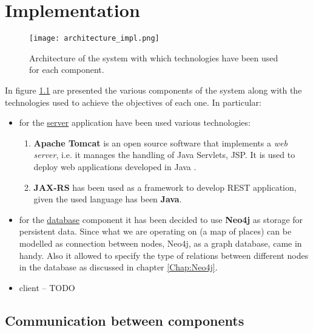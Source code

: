 \chapter{Implementation}\label{Chap:Impl}
\begin{figure}[!htb]
   \centering
   \texttt{[image: architecture\_impl.png]}
   \caption{Architecture of the system with which technologies have been used for each component.}\label{Fig:ArchImpl}
\end{figure}
In figure \ref{Fig:ArchImpl} are presented the various components of the system along with the technologies used to achieve the objectives of each one. In particular:
\begin{itemize}
  \item for the \underline{server} application have been used various technologies:
    \begin{enumerate}
      \item \textbf{Apache Tomcat} is an open source software that implements a \textit{web server}, i.e. it manages the handling of Java Servlets, JSP. It is used to deploy web applications developed in Java \parencite{tomcat}.
      \item \textbf{JAX-RS} has been used as a framework to develop REST application, given the used language has been \textbf{Java}.
    \end{enumerate}
  \item for the \underline{database} component it has been decided to use \textbf{Neo4j} as
    storage for persistent data. Since what we are operating on (a map of places) can be modelled as connection between nodes, Neo4j, as a graph database, came in handy. Also it allowed to specify the type of relations between different nodes in the database as discussed in chapter \ref{Chap:Neo4j}.
  \item client -- TODO
\end{itemize}


\section{Communication between components}


